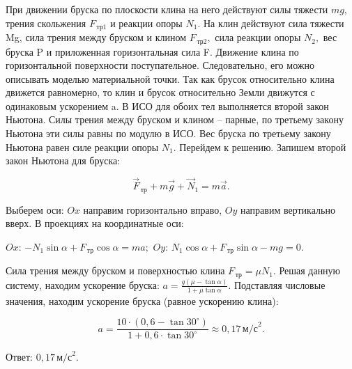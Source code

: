\documentclass[12pt,a4paper]{article}
\begin{document}
{При движении бруска по плоскости клина на него действуют силы тяжести $mg$, трения скольжения $F_{\,\text{тр}1}$  и реакции опоры $N_1.$ На клин действуют сила тяжести Mg, сила трения между бруском и клином $F_{\,\text{тр}2},$ сила реакции опоры $N_2,$ вес бруска P и приложенная горизонтальная сила F. Движение клина по горизонтальной поверхности поступательное. Следовательно, его можно описывать моделью материальной точки.
Так как брусок относительно клина движется равномерно, то клин и брусок относительно Земли движутся с одинаковым ускорением a. В ИСО для обоих тел выполняется второй закон Ньютона.
Силы трения между бруском и клином – парные, по третьему закону Ньютона эти силы равны по модулю в ИСО. Вес бруска по третьему закону Ньютона равен силе реакции опоры $N_{1}$.
Перейдем к решению.
Запишем второй закон Ньютона для бруска:

\[\vec F_{\,\text{тр}} + m\vec g + \vec N_1=m\vec a.\]

Выберем оси: $Ox$ направим горизонтально вправо, $Oy$ направим вертикально вверх. В проекциях на координатные оси:

$Ox$: $- N_1 \sin \alpha + F_{\,\text{тр}} \cos \alpha =ma;$
$Oy$: $N_1 \cos \alpha + F_{\,\text{тр}} \sin \alpha - mg=0.$

Сила трения между бруском и поверхностью клина $F_{\,\text{тр}}=\mu N_1.$
Решая данную систему, находим ускорение бруска: $a= \frac{g ( \mu - \tan \alpha )}{1 + \mu \tan \alpha} .$
Подставляя числовые значения, находим ускорение бруска (равное ускорению клина):

\[a= \frac{10 \cdot ( 0{,}6 - \tan 30 ^\circ )}{1 + 0{,}6 \cdot \tan 30 ^\circ} \approx 0{,}17 \,\text{м/с} ^2 .\]

Ответ: $0{,}17\,\text{м/с}^{2}$.
}
\end{document}
